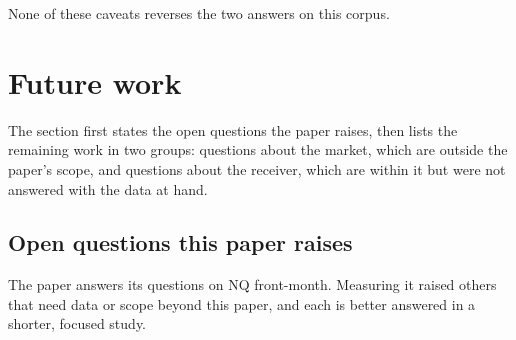 \documentclass[11pt]{article}
\begin{document}
None of these caveats reverses the two answers on this corpus.


\section{Future work}
\label{sec:future}

The section first states the open questions the paper raises, then lists the remaining
work in two groups: questions about the market, which are outside the paper's scope, and
questions about the receiver, which are within it but were not answered with the data at
hand.

\subsection{Open questions this paper raises}
\label{sec:open-questions}

The paper answers its questions on NQ front-month. Measuring it raised others that
need data or scope beyond this paper, and each is better answered in a shorter, focused
study.
\end{document}
